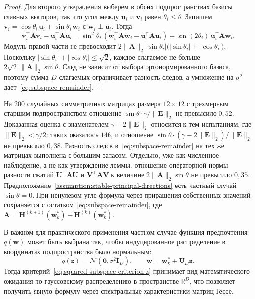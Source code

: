 \begin{proof}
    Для второго утверждения выберем в обоих подпространствах базисы главных векторов, так что угол между $\mathbf{u}_i$ и $\mathbf{v}_i$ равен $\theta_i\leqslant\theta$. Запишем $\mathbf{v}_i=\cos\theta_i\,\mathbf{u}_i+\sin\theta_i\,\mathbf{w}_i$ с $\mathbf{w}_i\perp\mathbf{u}_i$. Тогда
    \[
        \mathbf{v}_i^\top\mathbf{A}\mathbf{v}_i-\mathbf{u}_i^\top\mathbf{A}\mathbf{u}_i
        =
        \sin^2\theta_i\,(\mathbf{w}_i^\top\mathbf{A}\mathbf{w}_i-\mathbf{u}_i^\top\mathbf{A}\mathbf{u}_i)
        +
        \sin(2\theta_i)\,\mathbf{u}_i^\top\mathbf{A}\mathbf{w}_i.
    \]
    Модуль правой части не превосходит $2\|\mathbf{A}\|_2|\sin\theta_i|\bigl(|\sin\theta_i|+|\cos\theta_i|\bigr)$. Поскольку $|\sin\theta_i|+|\cos\theta_i|\leqslant\sqrt{2}$, каждое слагаемое не больше $2\sqrt{2}\,\|\mathbf{A}\|_2\sin\theta$. След не зависит от выбора ортонормированного базиса, поэтому сумма $D$ слагаемых ограничивает разность следов, а умножение на $\sigma^2$ дает~\eqref{eq:subspace-remainder}.
\end{proof}

На $200$ случайных симметричных матрицах размера $12\times 12$ с трехмерным старшим подпространством отношение $\sin\theta\cdot\gamma/\|\mathbf{E}\|_2$ не превысило $0{,}52$. Доказанная оценка с знаменателем $\gamma-2\|\mathbf{E}\|_2$ относится к тем испытаниям, где $\|\mathbf{E}\|_2<\gamma/2$: таких оказалось $146$, и отношение $\sin\theta\cdot(\gamma-2\|\mathbf{E}\|_2)/\|\mathbf{E}\|_2$ не превысило $0{,}38$. Разность следов в~\eqref{eq:subspace-remainder} на тех же матрицах выполнена с большим запасом. Отдельно, уже как численное наблюдение, а не как утверждение леммы: отношение операторной нормы разности сжатий $\mathbf{U}^\top\mathbf{A}\mathbf{U}$ и $\mathbf{V}^\top\mathbf{A}\mathbf{V}$ к величине $2\|\mathbf{A}\|_2\sin\theta$ не превысило $0{,}35$. Предположение~\ref{assumption:stable-principal-directions} есть частный случай $\sin\theta=0$. При ненулевом угле формула через приращения собственных значений сохраняется с остатком~\eqref{eq:subspace-remainder}, где $\mathbf{A}=\mathbf{H}^{(k+1)}(\mathbf{w}_k^*)-\mathbf{H}^{(k)}(\mathbf{w}_k^*)$.

\begin{remark}
    В важном для практического применения частном случае функция предпочтения~$q(\mathbf w)$
    может быть выбрана так, чтобы индуцированное распределение в координатах
    подпространства было нормальным:
    \begin{equation}
        \tilde{q}(\mathbf z) = \mathcal N(\mathbf 0, \sigma^2 \mathbf I_D),
        \qquad
        \mathbf w = \mathbf w_k^* + \mathbf U_D \mathbf z.
    \end{equation}
    Тогда критерий~\eqref{eq:squared-subspace-criterion-z} принимает вид
    математического ожидания по гауссовскому распределению в пространстве
    $\mathbb R^D$, что позволяет получить явную формулу через спектральные
    характеристики матриц Гессе.
\end{remark}

